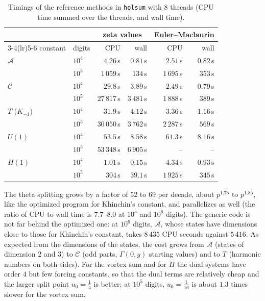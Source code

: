 \documentclass[11pt,reqno]{amsart}
\theoremstyle{definition}
\theoremstyle{remark}
\begin{document}
\begin{table}[tp]
\begin{tabular}{llrrrr}
\toprule
& & \multicolumn{2}{c}{zeta values} & \multicolumn{2}{c}{Euler--Maclaurin} \\
\cmidrule(lr){3-4}\cmidrule(lr){5-6}
constant & digits & CPU & wall & CPU & wall \\
\midrule
$\mathcal A$ & $10^4$ & $4.26$\,s & $0.81$\,s & $2.51$\,s & $0.82$\,s \\
 & $10^5$ & $1\,059$\,s & $134$\,s & $1\,695$\,s & $353$\,s \\
\midrule
$\mathcal C$ & $10^4$ & $29.8$\,s & $3.89$\,s & $2.49$\,s & $0.79$\,s \\
 & $10^5$ & $27\,817$\,s & $3\,481$\,s & $1\,888$\,s & $389$\,s \\
\midrule
$T$ ($K_{-1}$) & $10^4$ & $31.9$\,s & $4.12$\,s & $3.36$\,s & $1.16$\,s \\
 & $10^5$ & $30\,050$\,s & $3\,762$\,s & $2\,287$\,s & $569$\,s \\
\midrule
$U(1)$ & $10^4$ & $53.5$\,s & $8.58$\,s & $61.3$\,s & $8.16$\,s \\
 & $10^5$ & $53\,348$\,s & $6\,905$\,s & -- & -- \\
\midrule
$H(1)$ & $10^4$ & $1.01$\,s & $0.15$\,s & $4.34$\,s & $0.93$\,s \\
 & $10^5$ & $304$\,s & $39.1$\,s & $1\,925$\,s & $345$\,s \\
\bottomrule
\end{tabular}
\vspace{\abovecaptionskip}
\caption{Timings of the reference methods in \texttt{holsum} with $8$ threads (CPU time summed over the threads, and wall time).}
\label{tab:appsref}
\end{table}

The theta splitting grows by a factor of $52$ to $69$ per decade, about $p^{1.75}$ to $p^{1.85}$, like the optimized
program for Khinchin's constant, and parallelizes as well (the ratio of CPU to wall time is $7.7$--$8.0$ at $10^5$ and
$10^6$ digits). The generic code is not far behind the optimized one: at $10^6$ digits, $\mathcal A$, whose states have
dimensions close to those for Khinchin's constant, takes $8\,435$ CPU seconds against $5\,416$. As expected from the
dimensions of the states, the cost grows from $\mathcal A$ (states of dimension $2$ and $3$) to $\mathcal C$ (odd
parts, $\Gamma(0,y)$ starting values) and to $T$ (harmonic numbers on both sides). For the vortex sum and for $H$ the
dual systems have order $4$ but few forcing constants, so that the dual terms are relatively cheap and the larger
split point $u_0 = \frac14$ is better; at $10^5$ digits, $u_0 = \frac1{16}$ is about $1.3$ times slower for the vortex
sum.
\end{document}
